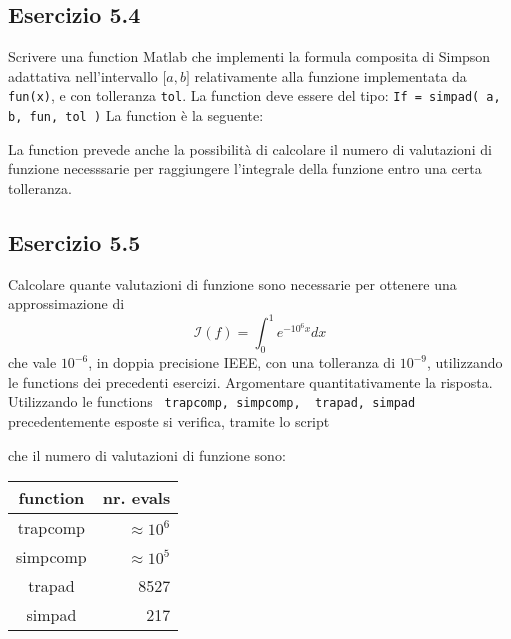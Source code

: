 	\subsection{Esercizio 5.4}
	
	Scrivere una function Matlab che implementi la formula composita di Simpson adattativa nell’intervallo $\lbrack a,b \rbrack$  relativamente alla funzione implementata da \lstinline{fun(x)}, e con tolleranza \lstinline{tol}. La function deve essere del tipo: \lstinline{If = simpad( a, b, fun, tol )}
\PP
La function è la seguente:

La function prevede anche la possibilità di calcolare il numero di valutazioni di funzione necesssarie per raggiungere l'integrale della funzione entro una certa tolleranza.



	\subsection{Esercizio 5.5}
	
	Calcolare quante valutazioni di funzione sono necessarie per ottenere una approssimazione di
\begin{equation*}
	\mathcal{I}(f) = \int_{0}^{1} e^{-10^6x}dx
\end{equation*}
che vale $10^{-6}$, in doppia precisione IEEE, con una tolleranza di $10^{-9}$, utilizzando le functions dei precedenti esercizi. Argomentare quantitativamente la risposta.
\PP
Utilizzando le functions \lstinline{ trapcomp, simpcomp,  trapad, simpad } precedentemente esposte si verifica, tramite lo script 

 che il numero di valutazioni di funzione sono: 
\begin{tabular}{c | r}
	\textbf{function} & \textbf{nr. evals}\\
	\hline
	trapcomp & $\approx 10^{6}$ \\
	simpcomp & $\approx 10^{5}$ \\
	trapad & 8527 \\ 
	simpad & 217 
\end{tabular}
